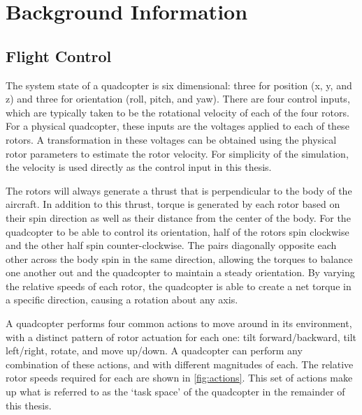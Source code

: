 \documentclass[letterpaper,12pt,titlepage,oneside,final]{book}
\begin{document}
\chapter{Background Information} \label{chap:background}

\section{Flight Control}


The system state of a quadcopter is six dimensional: three for position (x, y, and z) and three for orientation (roll, pitch, and yaw). 
There are four control inputs, which are typically taken to be the rotational velocity of each of the four rotors. 
For a physical quadcopter, these inputs are the voltages applied to each of these rotors.
A transformation in these voltages can be obtained using the physical rotor parameters to estimate the rotor velocity.
For simplicity of the simulation, the velocity is used directly as the control input in this thesis. 

The rotors will always generate a thrust that is perpendicular to the body of the aircraft. 
In addition to this thrust, torque is generated by each rotor based on their spin direction  as well as their distance from the center of the body.
For the quadcopter to be able to control its orientation, half of the rotors spin clockwise and the other half spin counter-clockwise. 
The pairs diagonally opposite each other across the body spin in the same direction, allowing the torques to balance one another out and the quadcopter to maintain a steady orientation. 
By varying the relative speeds of each rotor, the quadcopter is able to create a net torque in a specific direction, causing a rotation about any axis.

A quadcopter performs four common actions to move around in its environment, with a distinct pattern of rotor actuation for each one: 
tilt forward/backward, tilt left/right, rotate, and move up/down. 
A quadcopter can perform any combination of these actions, and with different magnitudes of each. The relative rotor speeds required for each are shown in \autoref{fig:actions}. This set of actions make up what is referred to as the `task space' of the quadcopter in the remainder of this thesis.
\end{document}
